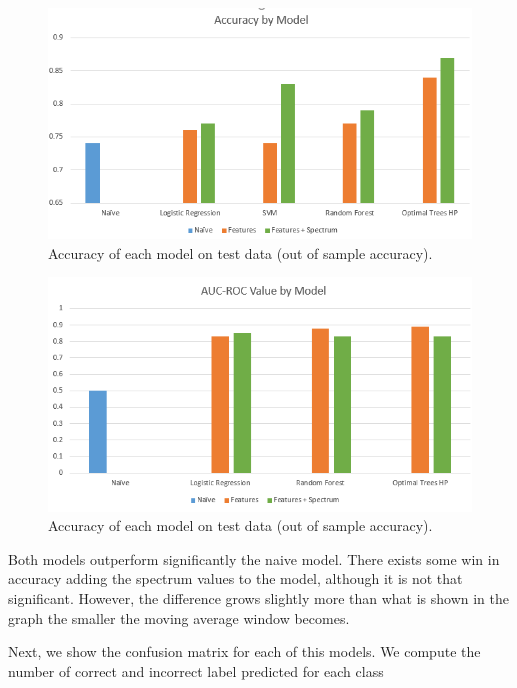\documentclass[letterpaper,11pt]{article}
\begin{document}
\begin{figure}[!htb]
	\centering
	\includegraphics[trim={0 0cm 0cm 0}, clip, scale=0.55]{figures/accuracy_model.png}
	\caption{Accuracy of each model on test data (out of sample accuracy).} 
	\label{fig:accuracy_model}
\end{figure}

\begin{figure}[!htb]
	\centering
	\includegraphics[trim={0 0cm 0cm 0}, clip, scale=0.55]{figures/auc_model.png}
	\caption{Accuracy of each model on test data (out of sample accuracy).} 
	\label{fig:auc_model}
\end{figure}

Both models outperform significantly the naive model. There exists some win in accuracy adding the spectrum values to the model, although it is not that significant. However, the difference grows slightly more than what is shown in the graph the smaller the moving average window becomes.

Next, we show the confusion matrix for each of this models. We compute the number of correct and incorrect label predicted for each class
\end{document}
